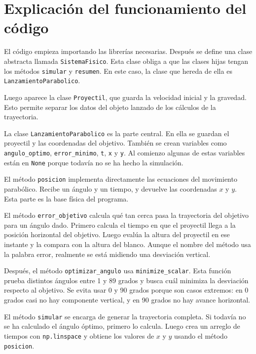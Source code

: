 \documentclass[12pt,letterpaper]{article}
\begin{document}
\section{Explicaci\'{o}n del funcionamiento del c\'{o}digo}

El c\'{o}digo empieza importando las librer\'{i}as necesarias. Despu\'{e}s se define una clase abstracta llamada \texttt{SistemaFisico}. Esta clase obliga a que las clases hijas tengan los m\'{e}todos \texttt{simular} y \texttt{resumen}. En este caso, la clase que hereda de ella es \texttt{LanzamientoParabolico}.

Luego aparece la clase \texttt{Proyectil}, que guarda la velocidad inicial y la gravedad. Esto permite separar los datos del objeto lanzado de los c\'{a}lculos de la trayectoria.

La clase \texttt{LanzamientoParabolico} es la parte central. En ella se guardan el proyectil y las coordenadas del objetivo. Tambi\'{e}n se crean variables como \texttt{angulo\_optimo}, \texttt{error\_minimo}, \texttt{t}, \texttt{x} y \texttt{y}. Al comienzo algunas de estas variables est\'{a}n en \texttt{None} porque todav\'{i}a no se ha hecho la simulaci\'{o}n.

El m\'{e}todo \texttt{posicion} implementa directamente las ecuaciones del movimiento parab\'{o}lico. Recibe un \'{a}ngulo y un tiempo, y devuelve las coordenadas \(x\) y \(y\). Esta parte es la base f\'{i}sica del programa.

El m\'{e}todo \texttt{error\_objetivo} calcula qu\'{e} tan cerca pasa la trayectoria del objetivo para un \'{a}ngulo dado. Primero calcula el tiempo en que el proyectil llega a la posici\'{o}n horizontal del objetivo. Luego eval\'{u}a la altura del proyectil en ese instante y la compara con la altura del blanco. Aunque el nombre del m\'{e}todo usa la palabra error, realmente se est\'{a} midiendo una desviaci\'{o}n vertical.

Despu\'{e}s, el m\'{e}todo \texttt{optimizar\_angulo} usa \texttt{minimize\_scalar}. Esta funci\'{o}n prueba distintos \'{a}ngulos entre 1 y 89 grados y busca cu\'{a}l minimiza la desviaci\'{o}n respecto al objetivo. Se evita usar 0 y 90 grados porque son casos extremos: en 0 grados casi no hay componente vertical, y en 90 grados no hay avance horizontal.

El m\'{e}todo \texttt{simular} se encarga de generar la trayectoria completa. Si todav\'{i}a no se ha calculado el \'{a}ngulo \'{o}ptimo, primero lo calcula. Luego crea un arreglo de tiempos con \texttt{np.linspace} y obtiene los valores de \(x\) y \(y\) usando el m\'{e}todo \texttt{posicion}.
\end{document}
